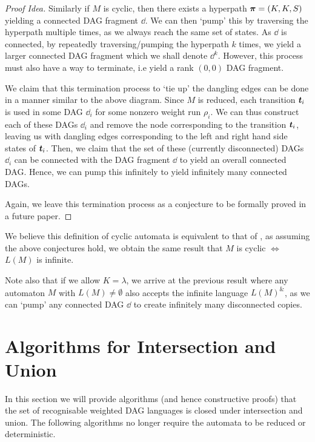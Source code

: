 \documentclass[11pt]{article}
\begin{document}
\begin{proof}[Proof Idea]
  Similarly if $M$ is cyclic, then there exists a hyperpath $\ppi = (K,K,S)$ yielding a
  connected DAG fragment $\dd$. We can then `pump' this by traversing the
  hyperpath multiple times, as we always reach the same set of states. As $\dd$
  is connected, by repeatedly traversing/pumping the hyperpath $k$ times, we
  yield a larger connected DAG fragment which we shall denote $\dd^k$. However,
  this process must also have a way to terminate, i.e yield a rank $(0,0)$ DAG
  fragment. 

  We claim that this termination process to `tie up' the dangling edges can be
  done in a manner similar to the above diagram. Since $M$ is reduced, each
  transition $\tt_i$ is used in some DAG $\dd_i$ for some nonzero weight run
  $\rho_i$. We can thus construct each of these DAGs $\dd_i$ and remove the node
  corresponding to the transition $\tt_i$, leaving us with dangling edges
  corresponding to the left and right hand side states of $\tt_i$. Then, we
  claim that the set of these (currently disconnected) DAGs $\dd_i$ can be
  connected with the DAG fragment $\dd$ to yield an overall connected DAG.
  Hence, we can pump this infinitely to yield infinitely many connected DAGs. 

  Again, we leave this termination process as a conjecture to be formally proved in a future paper. 

\end{proof}

We believe this definition of cyclic automata is equivalent to that of
\cite{blum2019properties}, as assuming the above conjectures hold, we obtain the
same result that $M$ is cyclic $\Longleftrightarrow$ $L(M)$ is infinite. 

Note also that if we allow $K = \lambda$, we arrive at the previous result where
any automaton $M$ with $L(M) \ne \emptyset$ also accepts the infinite language
${L(M)}^\&$, as we can `pump' any connected DAG $\dd$ to create infinitely many
disconnected copies. 

\section{Algorithms for Intersection and Union}

In this section we will provide algorithms (and hence constructive proofs) that
the set of recognisable weighted DAG languages is closed under intersection and
union. The following algorithms no longer require the automata to be reduced or
deterministic. 
\end{document}
